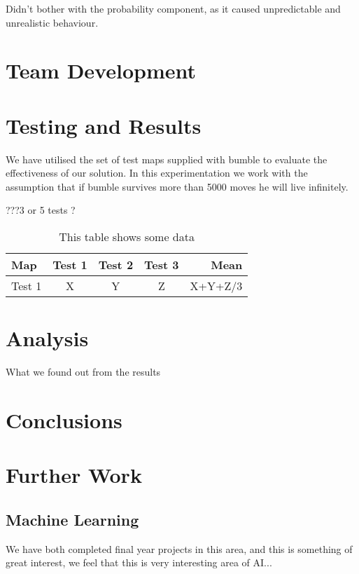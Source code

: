 \documentclass[a4paper,oneside]{report}
\begin{document}
Didn't bother with the probability component, as it caused unpredictable and unrealistic behaviour.

\section{Team Development}
	
\section{Testing and Results}

We have utilised the set of test maps supplied with bumble to evaluate the effectiveness of our solution. In this experimentation we work with the assumption that if bumble survives more than 5000 moves he will live infinitely.
	
	???3 or 5 tests ? 

\begin{table}[h!]
	\centering
	\begin{tabular}{| l | c | c | c | r |}
	\hline
		Map & Test 1 & Test 2 & Test 3 & Mean \\ \hline
		Test 1 &  X & Y & Z & X+Y+Z/3 \\ \hline
	\end{tabular}
	\caption{This table shows some data}
	\label{tab:myfirsttable}
\end{table}

\section{Analysis}

What we found out from the results

\section{Conclusions}

\section{Further Work}

\subsection{Machine Learning}
We have both completed final year projects in this area, and this is something of great interest, we feel that this is very interesting area of AI...

		
		
\end{document}
